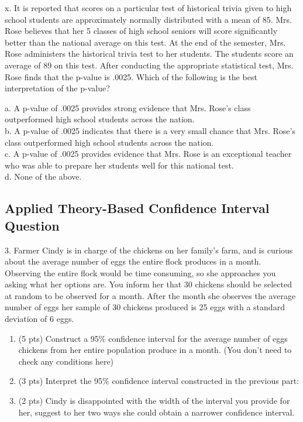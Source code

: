 \documentclass[11pt]{isuthesis}\usepackage[]{graphicx}\usepackage[]{color}
\begin{document}
\begin{appendices}
x. It is reported that scores on a particular test of historical trivia given to high school students are approximately normally distributed with a mean of 85. Mrs. Rose believes that her 5 classes of high school seniors will score significantly better than the national average on this test. At the end of the semester, Mrs. Rose administers the historical trivia test to her students. The students score an average of 89 on this test. After conducting the appropriate statistical test, Mrs. Rose finds that the p-value is .0025. Which of the following is the best interpretation of the p-value?

a. A p-value of .0025 provides strong evidence that Mrs. Rose's class outperformed high school students across the nation.\\
b. A p-value of .0025 indicates that there is a very small chance that Mrs. Rose's class outperformed high school students across the nation.\\
c. A p-value of .0025 provides evidence that Mrs. Rose is an exceptional teacher who was able to prepare her students well for this national test.\\
d. None of the above.\\


\subsection{Applied Theory-Based Confidence Interval Question}

3. Farmer Cindy is in charge of the chickens on her family's farm, and is curious about the average number of eggs the entire flock produces in a month.  Observing the entire flock would be time consuming, so she approaches you asking what her options are. You inform her that 30 chickens should be selected at random to be observed for a month. After the month she observes the average number of eggs her sample of 30 chickens produced is 25 eggs with a standard deviation of 6 eggs.  
\begin{enumerate} 
\item (5 pts) Construct a 95\% confidence interval for the average number of eggs chickens from her entire population produce in a month.  (You don't need to check any conditions here)  
\item (3 pts) Interpret the 95\% confidence interval constructed in the previous part:
\item (2 pts) Cindy is disappointed with the width of the interval you provide for her, suggest to her two ways she could obtain a narrower confidence interval.
\end{enumerate}


\end{appendices}
\end{document}
